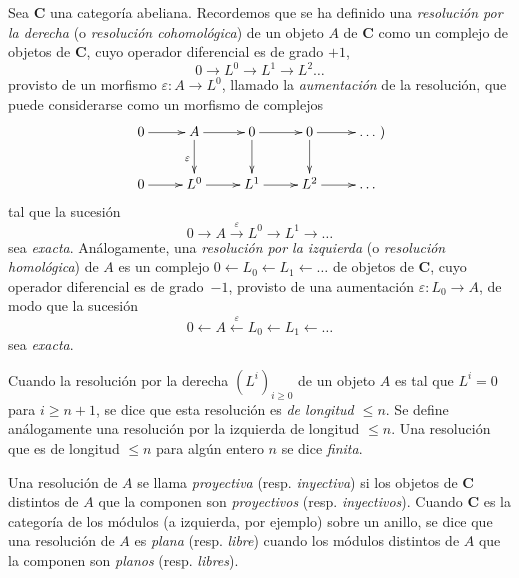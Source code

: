 \begin{env}[11.4.1]
\label{0.11.4.1}
\label{0.11.4.1-fr}
Sea $\boldsymbol{C}$ una categoría abeliana.
Recordemos que se ha definido una \emph{resolución por la derecha} (o \emph{resolución cohomológica}) de un objeto $A$ de $\boldsymbol{C}$ como un complejo de objetos de $\boldsymbol{C}$, cuyo operador diferencial es de grado $+1$,
\[
  0\longrightarrow L^0\longrightarrow L^1\longrightarrow L^2
  \ldots
\]
provisto de un morfismo $\varepsilon:A\to L^0$, llamado la \emph{aumentación} de la resolución, que puede considerarse como un morfismo de complejos
\[
\xymatrix{
  0\ar[r] & A\ar[r]\ar[d]_{\varepsilon} & 0\ar[r]\ar[d]
    & 0\ar[r]\ar[d] & \ldots\\
  0\ar[r] & L^0\ar[r] & L^1\ar[r] & L^2\ar[r] & \ldots
})
\]
tal que la sucesión
\[
  0\longrightarrow A\xrightarrow{\varepsilon}L^0\longrightarrow L^1
  \longrightarrow\ldots
\]
sea \emph{exacta}.
Análogamente, una \emph{resolución por la izquierda} (o \emph{resolución homológica}) de $A$ es un complejo $0\leftarrow L_0\leftarrow L_1\leftarrow\ldots$ de objetos de $\boldsymbol{C}$, cuyo operador diferencial es de grado~$-1$, provisto de una aumentación $\varepsilon:L_0\to A$, de modo que la sucesión
\[
  0\longleftarrow A\xleftarrow{\varepsilon}L_0\longleftarrow L_1
  \longleftarrow\ldots
\]
sea \emph{exacta}.

Cuando la resolución por la derecha $(L^i)_{i\geq0}$ de un objeto $A$ es tal que $L^i=0$ para $i\geq n+1$, se dice que esta resolución es \emph{de longitud $\leq n$}.
Se define análogamente una resolución por la izquierda de longitud $\leq n$.
Una resolución que es de longitud $\leq n$ para algún entero $n$ se dice \emph{finita}.

Una resolución de $A$ se llama \emph{proyectiva} (resp. \emph{inyectiva}) si los objetos de $\boldsymbol{C}$ distintos de $A$ que la componen son \emph{proyectivos} (resp. \emph{inyectivos}).
Cuando $\boldsymbol{C}$ es la categoría de los módulos (a izquierda, por ejemplo) sobre un anillo, se dice que una resolución de $A$ es \emph{plana} (resp. \emph{libre}) cuando los módulos distintos de $A$ que la componen son \emph{planos} (resp. \emph{libres}).
\end{env}

